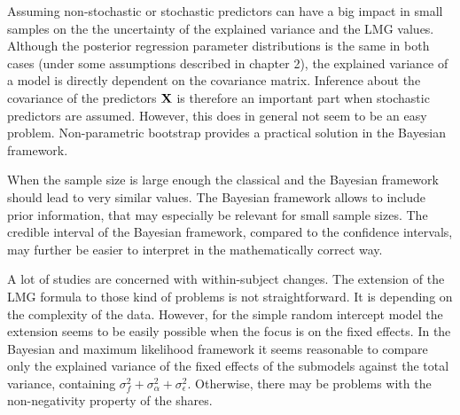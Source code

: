 \documentclass[11pt,a4paper,twoside]{book}
\begin{document}
Assuming non-stochastic or stochastic predictors can have a big impact in small samples on the the uncertainty of the explained variance and the LMG values. Although the posterior regression parameter distributions is the same in both cases (under some assumptions described in chapter 2), the explained variance of a model is directly dependent on the covariance matrix. Inference about the covariance of the predictors ${\mathbf{X}}$ is therefore an important part when stochastic predictors are assumed. However, this does in general not seem to be an easy problem. Non-parametric bootstrap provides a practical solution in the Bayesian framework. 

 When the sample size is large enough the classical and the Bayesian framework should lead to very similar values. The Bayesian framework allows to include prior information, that may especially be relevant for small sample sizes. The credible interval of the Bayesian framework, compared to the confidence intervals, may further be easier to interpret in the mathematically correct way.
 
A lot of studies are concerned with within-subject changes. The extension of the LMG formula to those kind of problems is not straightforward. It is depending on the complexity of the data. However, for the simple random intercept model the extension seems to be easily possible when the focus is on the fixed effects. In the Bayesian and maximum likelihood framework it seems reasonable to compare only the explained variance of the fixed effects of the submodels against the total variance, containing $\sigma_{f}^2 + \sigma_{\alpha}^2 + \sigma_{\epsilon}^2$. Otherwise, there may be problems with the non-negativity property of the shares. 







 

\end{document}
